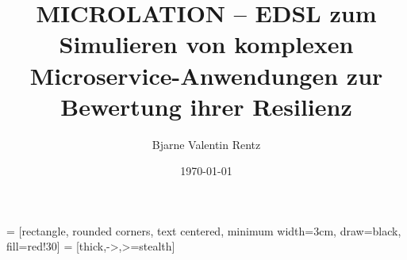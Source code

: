 \documentclass[aspectratio=169]{beamer}
\title{MICROLATION -- EDSL zum Simulieren von komplexen
Microservice-Anwendungen zur Bewertung ihrer Resilienz}
\date{\today}
\author{Bjarne Valentin Rentz}
\institute{NORDAKADEMIE, Hamburg Port Authority}
\begin{document}
  \usetikzlibrary{shapes.geometric, positioning, arrows, calc}

   = [rectangle, rounded corners, text centered, minimum width=3cm, draw=black, fill=red!30]
   = [thick,->,>=stealth]



  \maketitle

  
  
\end{document}
